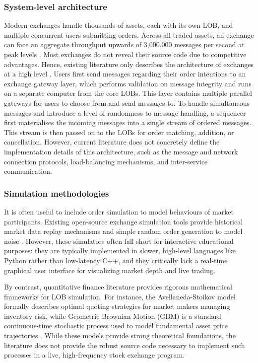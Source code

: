 \documentclass[12pt,a4paper]{article}
\begin{document}
\subsubsection{System-level architecture}
Modern exchanges handle thousands of assets, each with its own LOB, and multiple concurrent users submitting orders. Across all traded assets, an exchange can face an aggregate throughput upwards of 3,000,000 messages per second at peak levels \cite{ref4}. Most exchanges do not reveal their source code due to competitive advantages. Hence, existing literature only describes the architecture of exchanges at a high level \cite{ref1}. Users first send messages regarding their order intentions to an exchange gateway layer, which performs validation on message integrity and runs on a separate computer from the core LOBs. This layer contains multiple parallel gateways for users to choose from and send messages to. To handle simultaneous messages and introduce a level of randomness to message handling, a sequencer first materialises the incoming messages into a single stream of ordered messages. This stream is then passed on to the LOBs for order matching, addition, or cancellation. However, current literature does not concretely define the implementation details of this architecture, such as the message and network connection protocols, load-balancing mechanisms, and inter-service communication.

\subsubsection{Simulation methodologies}
It is often useful to include order simulation to model behaviours of market participants. Existing open-source exchange simulation tools provide historical market data replay mechanisms and simple random order generation to model noise \cite{ref5}. However, these simulators often fall short for interactive educational purposes: they are typically implemented in slower, high-level languages like Python rather than low-latency C++, and they critically lack a real-time graphical user interface for visualizing market depth and live trading.

By contrast, quantitative finance literature provides rigorous mathematical frameworks for LOB simulation. For instance, the Avellaneda-Stoikov model formally describes optimal quoting strategies for market makers managing inventory risk, while Geometric Brownian Motion (GBM) is a standard continuous-time stochastic process used to model fundamental asset price trajectories \cite{ref2}. While these models provide strong theoretical foundations, the literature does not provide the robust source code necessary to implement such processes in a live, high-frequency stock exchange program.
\end{document}

